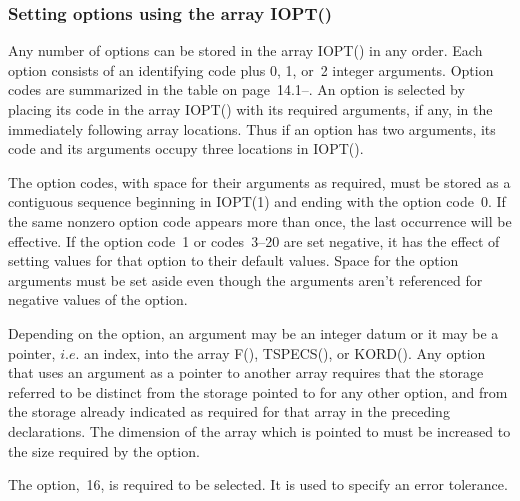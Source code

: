 \documentclass[twoside]{MATH77}
\begin{document}
\subsubsection{Setting options using the array IOPT()\label{IOPT}}

Any number of options can be stored in the array IOPT() in any order.  Each
option consists of an identifying code plus 0, 1, or~2 integer arguments.
Option codes are summarized in the table on page~14.1--\pageref{OptBrief}.  An
option is selected by placing its code in the array IOPT() with its
required arguments, if any, in the immediately following array locations.
Thus if an option has two arguments, its code and its arguments occupy
three locations in IOPT().

The option codes, with space for their arguments as required, must be
stored as a contiguous sequence beginning in IOPT(1) and ending with the
option code~0. If the same nonzero option code appears more than once, the
last occurrence will be effective. If the option code~1 or codes~3--20 are
set negative, it has the effect of setting values for that option to their
default values. Space for the option arguments must be set aside even
though the arguments aren't referenced for negative values of the option.

Depending on the option, an argument may be an integer datum or it may be a
pointer, $i.e$. an index, into the array F(), TSPECS(), or KORD(). Any
option that uses an argument as a pointer to another array requires that the
storage referred to be distinct from the storage pointed to for any other
option, and from the storage already indicated as required for that array in
the preceding declarations. The dimension of the array which is pointed to
must be increased to the size required by the option.

The option,~16, is required to be selected. It is used to specify an error
tolerance.
\end{document}
